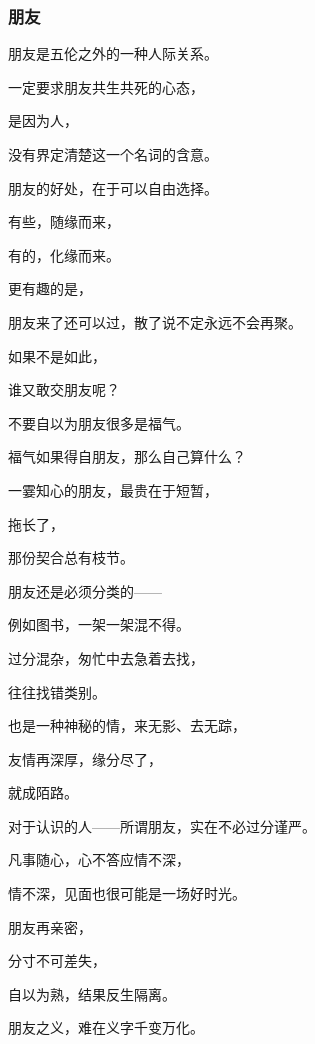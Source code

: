 \subsubsection{朋友}


\par 朋友是五伦之外的一种人际关系。
\par 一定要求朋友共生共死的心态，
\par 是因为人，
\par 没有界定清楚这一个名词的含意。
\par 
\par 朋友的好处，在于可以自由选择。
\par 有些，随缘而来，
\par 有的，化缘而来。
\par 更有趣的是，
\par 朋友来了还可以过，散了说不定永远不会再聚。
\par 如果不是如此，
\par 谁又敢交朋友呢？
\par 
\par 不要自以为朋友很多是福气。
\par 福气如果得自朋友，那么自己算什么？
\par 
\par 一霎知心的朋友，最贵在于短暂，
\par 拖长了，
\par 那份契合总有枝节。
\par 
\par 朋友还是必须分类的——
\par 例如图书，一架一架混不得。
\par 过分混杂，匆忙中去急着去找，
\par 往往找错类别。
\par 也是一种神秘的情，来无影、去无踪，
\par 友情再深厚，缘分尽了，
\par 就成陌路。
\par 
\par 对于认识的人——所谓朋友，实在不必过分谨严。
\par 凡事随心，心不答应情不深，
\par 情不深，见面也很可能是一场好时光。
\par 
\par 朋友再亲密，
\par 分寸不可差失，
\par 自以为熟，结果反生隔离。
\par 
\par 朋友之义，难在义字千变万化。
